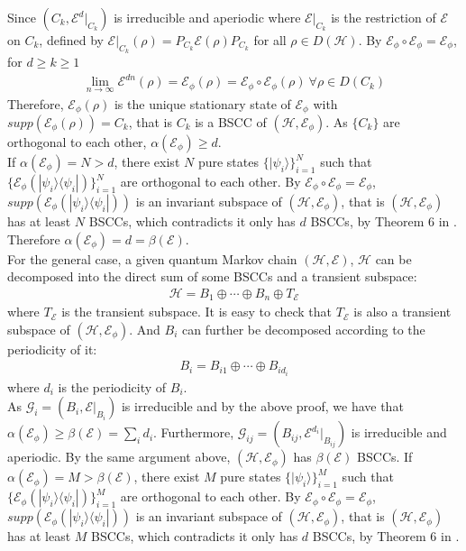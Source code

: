 \documentclass{article}
\newcommand{\supp}[1]{\ensuremath{\lceil{#1}\rceil}}
\def\E{\mathcal{E}}
\def\H{\mathcal{H}}
\def\supp{\textrm{supp}}
\def\supp{\mathit{supp}}
\begin{document}
Since $(C_{k},\E^{d}|_{C_{k}} )$  is irreducible and aperiodic where $\E|_{C_{k}}$ is the restriction of $\E$ on $C_{k}$, defined by $\E|_{C_{k}}(\rho)=P_{C_{k}}\E(\rho)P_{C_{k}} $ for all $\rho \in D(\H)$. By $\E_{\phi}\circ\E_{\phi}=\E_{\phi}$, for $d\geq k\geq1$
\begin{eqnarray*}
\lim_{n\rightarrow \infty}\E^{dn}(\rho)=\E_{\phi}(\rho)=\E_{\phi}\circ\E_{\phi}(\rho) \ \forall \rho \in D(C_{k})
\end{eqnarray*}
Therefore, $\E_{\phi}(\rho)$ is the unique stationary state of $\E_{\phi}$ with $\supp(\E_{\phi}(\rho))=C_{k}$, that is $C_{k}$ is a BSCC of $(\H,\E_{\phi})$. As $\{C_{k}\}$ are orthogonal to each other, $\alpha(\E_{\phi})\geq d$.\\

If $\alpha(\E_{\phi})=N>d$, there exist $N$ pure states $\{|\psi_{i}\rangle\}_{i=1}^{N}$ such that $\{\E_{\phi}(|\psi_{i}\rangle\langle \psi _{i}|)\}_{i=1}^{N}$ are orthogonal to each other. By $\E_{\phi}\circ\E_{\phi}=\E_{\phi}$, $\supp(\E_{\phi}(|\psi_{i}\rangle\langle \psi_{i}|))$ is an invariant subspace of $(\H,\E_{\phi})$, that is $(\H,\E_{\phi})$ has at least $N$ BSCCs, which contradicts it only has $d$ BSCCs, by Theorem 6 in  \cite{ying2013reachability}. Therefore $\alpha(\E_{\phi})=d=\beta(\E)$.\\

For the general case, a given quantum Markov chain $(\H,\E)$, $\H$ can be decomposed into the direct sum of some BSCCs and a transient subspace:
\begin{eqnarray*}
\H=B_{1}\oplus\cdots \oplus B_{n}\oplus T_{\E}
\end{eqnarray*}
where $T_{\E}$ is the transient subspace. It is easy to check that $T_{\E}$ is also a transient subspace of $(\H,\E_{\phi})$.
And $B_{i}$ can further be decomposed according to the periodicity of it:
\begin{eqnarray*}
B_{i}=B_{i1}\oplus\cdots \oplus B_{id_{i}}
\end{eqnarray*}
where $d_{i}$ is the periodicity of $B_{i}$.\\

As $\mathcal{G}_i=(B_{i},\E|_{B_{i}})$ is irreducible and by the above proof, we have that $\alpha(\E_{\phi})\geq \beta(\E)=\sum_{i}d_{i}$. Furthermore, $\mathcal{G}_{ij}=(B_{ij},\E^{d_{i}}|_{B_{ij}})$ is irreducible and aperiodic. By the same argument above, $(\H,\E_{\phi})$ has $\beta(\E)$ BSCCs.
If $\alpha(\E_{\phi})=M>\beta(\E)$, there exist $M$ pure states $\{|\psi_{i}\rangle\}_{i=1}^{M}$ such that $\{\E_{\phi}(|\psi_{i}\rangle\langle \psi _{i}|)\}_{i=1}^{M}$ are orthogonal to each other. By $\E_{\phi}\circ\E_{\phi}=\E_{\phi}$, $\supp(\E_{\phi}(|\psi_{i}\rangle\langle \psi_{i}|))$ is an invariant subspace of $(\H,\E_{\phi})$, that is $(\H,\E_{\phi})$ has at least $M$ BSCCs, which contradicts it only has $d$ BSCCs, by Theorem 6 in  \cite{ying2013reachability}. 
\end{document}
